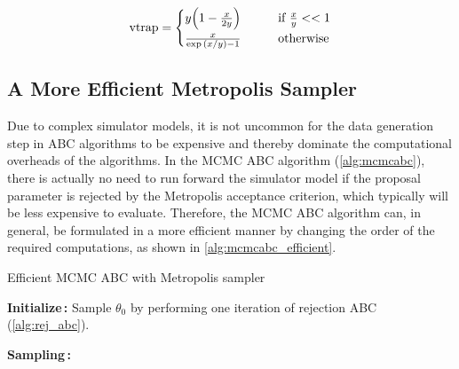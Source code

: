 \begin{equation}\label{eq:vtrap}
    \mathrm{vtrap} = \begin{cases}
    y \qty(1 - \frac{x}{2y}) \qquad &\text{if } \frac{x}{y} << 1
    \\
    \frac{x}{\exp \qty(x/y) - 1} \qquad &\text{otherwise}
    \end{cases}
\end{equation}

\subsection{A More Efficient Metropolis Sampler}

Due to complex simulator models, it is not uncommon for the data generation step in ABC algorithms to be expensive and thereby dominate the computational overheads of the algorithms. In the MCMC ABC algorithm (\cref{alg:mcmcabc}), there is actually no need to run forward the simulator model if the proposal parameter is rejected by the Metropolis acceptance criterion, which typically will be less expensive to evaluate. Therefore, the MCMC ABC algorithm can, in general, be formulated in a more efficient manner by changing the order of the required computations, as shown in \cref{alg:mcmcabc_efficient}. 

\begin{algorithm}[!htb]
\caption{Efficient MCMC ABC with Metropolis sampler}
\label{alg:mcmcabc_efficient}
\SetAlgoLined
\DontPrintSemicolon
 \textbf{Initialize\,:}\;
 \nl Sample $\theta_0$ by performing one iteration of rejection ABC (\cref{alg:rej_abc}).\;

 \vspace{5mm}
 \textbf{Sampling\,:}\;
\end{algorithm}



